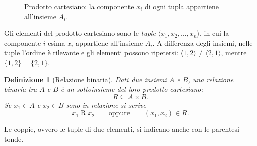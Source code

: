 \documentclass[a4paper, 11pt, oneside]{book}
\theoremstyle{formale}
\newtheorem*{definition}{Definizione}
\begin{document}
    \begin{figure}[H]
        \centering
        \caption{Prodotto cartesiano: la componente $x_i$ di ogni tupla appartiene
            all'insieme $A_i$.}
        \label{fig:prodotto}
    \end{figure}

    Gli elementi del prodotto cartesiano sono le \emph{tuple}
    $\langle x_1, x_2, \dots, x_n \rangle$, in cui la componente $i$-esima $x_i$ appartiene
    all'insieme $A_i$. A differenza degli insiemi, nelle tuple l'ordine \`e rilevante e gli
    elementi possono ripetersi: $\langle 1, 2 \rangle \neq \langle 2, 1 \rangle$, mentre
    $\{1, 2\} = \{2, 1\}$.

    \begin{definition}[Relazione binaria]
        Dati due insiemi $A$ e $B$, una \emph{relazione binaria} tra $A$ e $B$ \`e un
        sottoinsieme del loro prodotto cartesiano:
        \begin{equation*}
            R \subseteq A \times B.
        \end{equation*}
        Se $x_1 \in A$ e $x_2 \in B$ sono in relazione si scrive
        \begin{equation*}
            x_1 \mathrel{R} x_2 \qquad \text{oppure} \qquad (x_1, x_2) \in R.
        \end{equation*}
    \end{definition}
    Le coppie, ovvero le tuple di due elementi, si indicano anche con le parentesi tonde.
\end{document}
